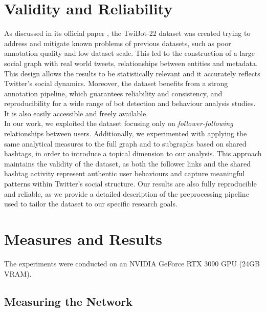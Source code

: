 \documentclass[12pt, a4paper]{article}
\begin{document}
\section{Validity and Reliability}
	\label{validity-and-reliability-not-needed-for-the-project-proposal}
   As discussed in its official paper \cite{twibot22}, the TwiBot-22 dataset was created trying to address and mitigate known problems of previous datasets, such as poor annotation quality and low dataset scale. This led to the construction of a large social graph with real world tweets, relationships between entities and metadata. This design allows the results to be statistically relevant and it accurately reflects Twitter’s social dynamics. Moreover, the dataset benefits from a strong annotation pipeline, which guarantees reliability and consistency, and reproducibility for a wide range of bot detection and behaviour analysis studies. It is also easily accessible and freely available.\\
    In our work, we exploited the dataset focusing only on \textit{follower-following} relationships between users. Additionally, we experimented with applying the same analytical measures to the full graph and to subgraphs based on shared hashtags, in order to introduce a topical dimension to our analysis. This approach maintains the validity of the dataset, as both the follower links and the shared hashtag activity represent authentic user behaviours and capture meaningful patterns within Twitter’s social structure. Our results are also fully reproducible and reliable, as we provide a detailed description of the preprocessing pipeline used to tailor the dataset to our specific research goals.


\section{Measures and Results}
	\label{measures}
	The experiments were conducted on an NVIDIA GeForce RTX 3090 GPU (24GB VRAM).
	\subsection{Measuring the Network}
\end{document}
